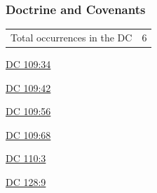 	\subsubsection{Doctrine and Covenants} %
		\label{JEHOVAH-DC}
	
		\begin{tabular}{ll}
			Total occurrences in the DC & 6
		\end{tabular}
		
		\begin{compactdesc}
			\item[{\hyperref[DC109-34]{DC 109:34}}]
			\item[{\hyperref[DC109-42]{DC 109:42}}]
			\item[{\hyperref[DC109-56]{DC 109:56}}]
			\item[{\hyperref[DC109-68]{DC 109:68}}]
			\item[{\hyperref[DC110-3]{DC 110:3}}]
			\item[{\hyperref[DC128-9]{DC 128:9}}]
		\end{compactdesc}
		
	
		
		

	
			
